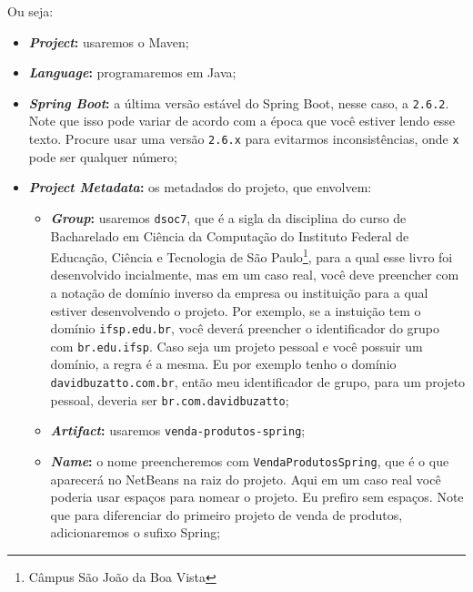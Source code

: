 Ou seja:

\begin{itemize}

    \item \textbf{\textit{Project}:} usaremos o Maven;
    
    \item \textbf{\textit{Language}:} programaremos em Java;
    
    \item \textbf{\textit{Spring Boot}:} a última versão estável do Spring Boot, nesse caso, a \texttt{2.6.2}. Note que isso pode variar de acordo com a época que você estiver lendo esse texto. Procure usar uma versão \texttt{2.6.x} para evitarmos inconsistências, onde \texttt{x} pode ser qualquer número;
    
    \item \textbf{\textit{Project Metadata}:} os metadados do projeto, que envolvem:
    
    \begin{itemize}
    
        \item \textbf{\textit{Group}:} usaremos \texttt{dsoc7}, que é a sigla da disciplina do curso de Bacharelado em Ciência da Computação do Instituto Federal de Educação, Ciência e Tecnologia de São Paulo\footnote{Câmpus São João da Boa Vista}, para a qual esse livro foi desenvolvido incialmente, mas em um caso real, você deve preencher com a notação de domínio inverso da empresa ou instituição para a qual estiver desenvolvendo o projeto. Por exemplo, se a instuição tem o domínio \texttt{ifsp.edu.br}, você deverá preencher o identificador do grupo com \texttt{br.edu.ifsp}. Caso seja um projeto pessoal e você possuir um domínio, a regra é a mesma. Eu por exemplo tenho o domínio \texttt{davidbuzatto.com.br}, então meu identificador de grupo, para um projeto pessoal, deveria ser \texttt{br.com.davidbuzatto};
        
        \item \textbf{\textit{Artifact}:} usaremos \texttt{venda-produtos-spring};
        
        \item \textbf{\textit{Name}:} o nome preencheremos com \texttt{VendaProdutosSpring}, que é o que aparecerá no NetBeans na raiz do projeto. Aqui em um caso real você poderia usar espaços para nomear o projeto. Eu prefiro sem espaços. Note que para diferenciar do primeiro projeto de venda de produtos, adicionaremos o sufixo Spring;
        

\end{itemize}
\end{itemize}
